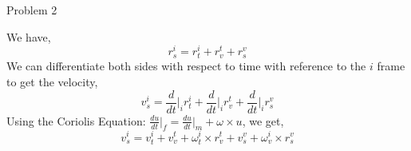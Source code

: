 \documentclass[answers]{exam}
\begin{document}
\begin{questions}
    \question Problem 2
    \begin{solution}
        We have,
        \begin{equation*}
            r^i_s = r^i_t + r^t_v + r^v_s
        \end{equation*}
        We can differentiate both sides with respect to time with reference to the $i$ frame to get the velocity,
        \begin{equation*}
            v^i_s  =  \dfrac{d}{dt}\Big|_i r^i_t + \frac{d}{dt}\Big|_i r^t_v +\frac{d}{dt}\Big|_i r^v_s
        \end{equation*}
        Using the Coriolis Equation: $\frac{du}{dt}\big|_f  = \frac{du}{dt}\big|_m  + \omega \times u$, we get,
        \begin{equation*}
            v^i_s  = v^i_t +v^t_v + \omega^i_t \times r^t_v + v^v_s + \omega^i_v \times r^v_s

\end{equation*}
\end{solution}
\end{questions}
\end{document}
